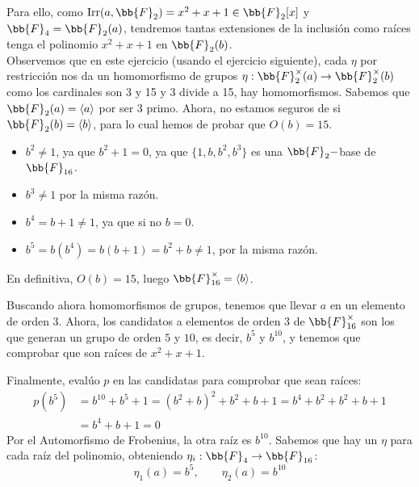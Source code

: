\begin{ejercicio}
    \begin{figure}[H]
        \centering
    \end{figure}

    \noindent
    Para ello, como $\Irr(a,\bb{F}_2) = x^2+x+1\in \bb{F}_2[x]$ y $\bb{F}_4 = \bb{F}_2(a)$, tendremos tantas extensiones de la inclusión como raíces tenga el polinomio $x^2+x+1$ en $\bb{F}_2(b)$.\\

    \noindent
    Observemos que en este ejercicio (usando el ejercicio siguiente), cada $\eta$ por restricción nos da un homomorfismo de grupos $\eta:\bb{F}_2^\times(a)\to \bb{F}_2^\times(b)$ como los cardinales son 3 y 15 y 3 divide a 15, hay homomorfismos. Sabemos que $\bb{F}_2(a) = \langle a \rangle $ por ser 3 primo. Ahora, no estamos seguros de si $\bb{F}_2(b) = \langle b \rangle $, para lo cual hemos de probar que $O(b) = 15$.

    \begin{itemize}
        \item $b^2\neq 1$, ya que $b^2+1=0$, ya que $\{1,b,b^2, b^3\}$ es una $\bb{F}_2-$base de $\bb{F}_{16}$.
        \item $b^3\neq 1$ por la misma razón.
        \item $b^4 = b+1\neq 1$, ya que si no $b = 0$.
        \item $b^5 = b(b^4) = b(b+1) = b^2 + b \neq 1$, por la misma razón.
    \end{itemize}
    En definitiva, $O(b)=15$, luego $\bb{F}_{16}^{\times} = \langle b \rangle $.

    \noindent
    Buscando ahora homomorfismos de grupos, tenemos que llevar $a$ en un elemento de orden 3. Ahora, los candidatos a elementos de orden 3 de $\bb{F}_{16}^\times$ son los que generan un grupo de orden $5$ y $10$, es decir, $b^5$ y $b^{10}$, y tenemos que comprobar que son raíces de $x^2+x+1$.

    Finalmente, evalúo $p$ en las candidatas para comprobar que sean raíces:
    \begin{align*}
        p(b^5) &= b^{10} + b^{5} + 1 = {(b^2 + b)}^{2} + b^2 + b + 1 = b^4 + b^2 + b^2 + b + 1 \\
               &= b^4 + b + 1 = 0 
    \end{align*}
    Por el Automorfismo de Frobenius, la otra raíz es $b^{10}$. Sabemos que hay un $\eta$ para cada raíz del polinomio, obteniendo $\eta_i:\bb{F}_4\to \bb{F}_{16}$:
    \begin{equation*}
        \eta_1(a) = b^5, \qquad \eta_2(a) = b^{10}
    \end{equation*}
\end{ejercicio}

